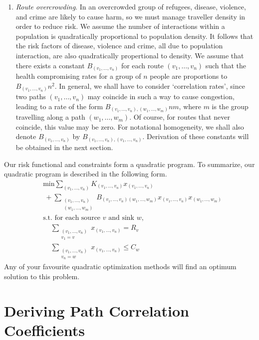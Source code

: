 \documentclass{article}
\begin{document}
\begin{enumerate}
\begin{enumerate}
    \item {\it Route overcrowding}. In an overcrowded group of refugees, disease, violence, and crime are likely to cause harm, so we must manage traveller density in order to reduce risk. We assume the number of interactions within a population is quadratically proportional to population density. It follows that the risk factors of disease, violence and crime, all due to population interaction, are also quadratically propertional to density. We assume that there exists a constant $B_{(v_1, \dots, v_n)}$ for each route $(v_1, \dots, v_n)$ such that the health compromising rates for a group of $n$ people are proportions to $B_{(v_1, \dots, v_n)} n^2$. In general, we shall have to consider `correlation rates', since two paths $(v_1, \dots, v_n)$ may coincide in such a way to cause congestion, leading to a rate of the form $B_{(v_1, \dots, v_n), (w_1, \dots, w_m)} n m$, where $m$ is the group travelling along a path $(w_1, \dots, w_m)$. Of course, for routes that never coincide, this value may be zero. For notational homogeneity, we shall also denote $B_{(v_1, \dots, v_n)}$ by $B_{(v_1, \dots, v_n), (v_1, \dots, v_n)}$. Derivation of these constants will be obtained in the next section.
\end{enumerate}

Our risk functional and constraints form a quadratic program. To summarize, our quadratic program is described in the following form.
%
\begin{align*}
    &\text{min} \sum_{(v_1, \dots, v_n)} K_{(v_1, \dots, v_n)} x_{(v_1, \dots, v_n)}\\
    & \ + \sum_{\substack{(v_1, \dots, v_n)\\(w_1, \dots, w_m)}} B_{(v_1, \dots, v_n) (w_1, \dots, w_m)} x_{(v_1, \dots, v_n)} x_{(w_1, \dots, w_m)}\\
    &\text{s.t. for each source $v$ and sink $w$,}\\
    &\ \ \ \ \ \sum_{\substack{(v_1, \dots, v_n) \\ v_1 = v}} x_{(v_1, \dots, v_n)} = R_v\\
    &\ \ \ \ \ \sum_{\substack{(v_1, \dots, v_n) \\ v_n = w}} x_{(v_1, \dots, v_n)} \leq C_w
\end{align*}
%
Any of your favourite quadratic optimization methods will find an optimum solution to this problem.

\section{Deriving Path Correlation Coefficients}


\end{enumerate}
\end{document}
